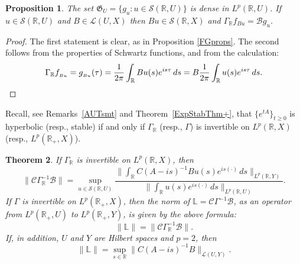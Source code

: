 \documentclass[10pt,psamsfonts,leqno]{siamltex}
\newtheorem{prop}{Proposition}[section]
\newtheorem{thm}[prop]{Theorem}
\newcommand{\bbR}{\mathbb{R}}
\newcommand{\bbL}{\mathbb{L}}
\newcommand{\calB}{\mathcal{B}}
\newcommand{\calC}{\mathcal{C}}
\newcommand{\calS}{\mathcal{S}}
\newcommand{\scrG}{\mathfrak{G}}
\newcommand{\lb}{\label}
\newcommand{\LpR}{{L^p(\bbR,X)}}
\newcommand{\LpRX}{{L^p(\bbR_+,X)}}
\newcommand{\LpRU}{{L^p(\bbR_+,U)}}
\newcommand{\LpRY}{{L^p(\bbR_+,Y)}}
\begin{document}
\begin{prop}\lb{GUdense}
The set $\scrG_U = \{ g_u: u\in \calS (\bbR,U)\}$ is dense in
$L^p(\bbR,U)$. If $u\in \calS (\bbR,U)$ and $B\in \mathcal{L}(U,X)$ then
$ B u\in
\calS (\bbR,X)$ and $\Gamma _\bbR f_{Bu}= \calB g_u$.
\end{prop}

\begin{proof}
The first statement is clear, as in Proposition \ref{FGprops}. The
second follows from the properties of Schwartz functions, and
from the calculation:
\begin{equation*}
\Gamma_\bbR f_{{\null}_{Bu}} = g_{{\null}_{Bu}}(\tau) =
\frac{1}{2\pi}\int_\bbR Bu(s) e^{is \tau}\, ds = B
\frac{1}{2\pi}\int_\bbR u(s) e^{is \tau}\, ds .
\end{equation*}
\end{proof}

Recall, see Remarks~\ref{AUTsmt} and Theorem~\ref{ExpStabThm+}, that
$\{e^{tA}\}_{t\ge 0}$ is hyperbolic (resp., stable) if and only if
$\Gamma_{\mathbb R}$
(resp., $\Gamma$) is invertible on $L^p({\mathbb R},X)$ (resp.,
$L^p({\mathbb
R}_+,X)$).

\begin{thm}\label{LnormThm}
If $\Gamma_\bbR$ is invertible on $\LpR$, then
\begin{equation}\lb{Lnorm1}
\| \calC  \Gamma_\bbR^{-1} \calB \| = \sup_{u\in \calS(\bbR, U)}
\frac{\|\int_\bbR C(A-is)^{-1}Bu(s)e^{is(\cdot)}\,ds
\|_{L^p(\bbR,Y)}} {\|\int_\bbR u(s)e^{is(\cdot)}\,ds\|_{L^p(\bbR,U)}}.
\end{equation}
If $\Gamma$ is invertible on $\LpRX$, then the norm of $\bbL = \calC
\Gamma^{-1} \calB $, as an operator from $\LpRU$ to $\LpRY$, is given by
the above formula:
\begin{equation}\label{Lnorm2}
\|\bbL\| = \| \calC \Gamma_\bbR^{-1} \calB \|.
\end{equation}
If, in addition, $U$ and $Y$ are Hilbert spaces and $p=2$, then
\begin{equation}\label{p=2}
\|\bbL\| = \sup_{s\in\bbR} \| C (A-is)^{-1} B
\|_{\mathcal{L}(U,Y)}.
\end{equation}
\end{thm}
\end{document}

